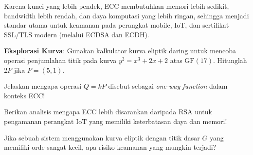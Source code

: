 \begin{catatan}
Karena kunci yang lebih pendek, ECC membutuhkan memori lebih sedikit, bandwidth lebih rendah, dan daya komputasi yang lebih ringan, sehingga menjadi standar utama untuk keamanan pada perangkat mobile, IoT, dan sertifikat SSL/TLS modern (melalui ECDSA dan ECDH).
\end{catatan}

\begin{aktivitas}
  \item \textbf{Eksplorasi Kurva}: Gunakan kalkulator kurva eliptik daring untuk mencoba operasi penjumlahan titik pada kurva $y^2 = x^3 + 2x + 2$ atas $\mathrm{GF}(17)$. Hitunglah $2P$ jika $P = (5, 1)$.
\end{aktivitas}

\begin{latihan}
  \item Jelaskan mengapa operasi $Q = kP$ disebut sebagai \textit{one-way function} dalam konteks ECC!
  \item Berikan analisis mengapa ECC lebih disarankan daripada RSA untuk pengamanan perangkat IoT yang memiliki keterbatasan daya dan memori!
  \item Jika sebuah sistem menggunakan kurva eliptik dengan titik dasar $G$ yang memiliki orde sangat kecil, apa risiko keamanan yang mungkin terjadi?
\end{latihan}
